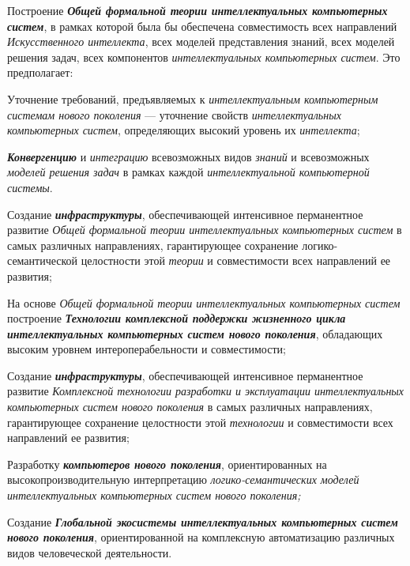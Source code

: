 \begin{textitemize}
	\item
	Построение \textbf{\textit{Общей формальной теории интеллектуальных компьютерных систем}}, в рамках которой была бы обеспечена совместимость всех направлений \textit{Искусственного интеллекта}, всех моделей представления знаний, всех моделей решения задач, всех компонентов \textit{интеллектуальных компьютерных систем}. Это предполагает:
	
	\begin{textitemize}
		\item
		Уточнение требований, предъявляемых к \textit{интеллектуальным компьютерным системам нового поколения} --- уточнение свойств \textit{интеллектуальных компьютерных систем}, определяющих высокий уровень их \textit{интеллекта};
		\item
		\textbf{\textit{Конвергенцию}} и \textit{интеграцию} всевозможных видов \textit{знаний} и всевозможных \textit{моделей решения задач} в рамках каждой \textit{интеллектуальной компьютерной системы}.
	\end{textitemize}
	
	\item
	Создание \textbf{\textit{инфраструктуры}}, обеспечивающей интенсивное перманентное развитие \textit{Общей формальной теории интеллектуальных компьютерных систем} в самых различных направлениях, гарантирующее сохранение логико-семантической целостности этой \textit{теории} и совместимости всех направлений ее развития;
	\item
	На основе \textit{Общей формальной теории интеллектуальных компьютерных систем} построение \textbf{\textit{Технологии комплексной поддержки жизненного цикла интеллектуальных компьютерных систем нового поколения}}, обладающих высоким уровнем интероперабельности и совместимости;
	\item
	Создание \textbf{\textit{инфраструктуры}}, обеспечивающей интенсивное перманентное развитие \textit{Комплексной технологии разработки и эксплуатации интеллектуальных компьютерных систем нового поколения} в самых различных направлениях, гарантирующее сохранение целостности этой \textit{технологии} и совместимости всех направлений ее развития;
	\item
	Разработку \textbf{\textit{компьютеров нового поколения}}, ориентированных на высокопроизводительную интерпретацию \textit{логико-семантических моделей интеллектуальных компьютерных систем нового поколения;}
	\item
	Создание \textbf{\textit{Глобальной экосистемы интеллектуальных компьютерных систем нового поколения}}, ориентированной на комплексную автоматизацию различных видов человеческой деятельности.
\end{textitemize}

